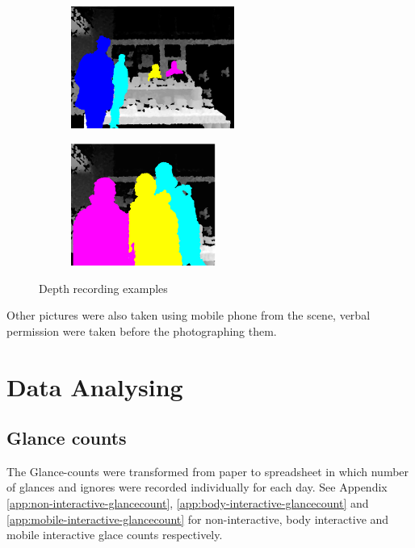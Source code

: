 \begin{enumerate}
\begin{figure}[H]
    \centering
    \begin{subfigure}[H]{0.45\textwidth}
        \centering
        \includegraphics[width=\textwidth,height=4cm]{Figures/8/d1}
        \caption{}
        \label{fig:d1}
    \end{subfigure}
    \begin{subfigure}[H]{0.45\textwidth}
        \centering
        \includegraphics[width=\textwidth,height=4cm]{Figures/8/d2}
        \caption{}
        \label{fig:d2}
    \end{subfigure}
    \caption{Depth recording examples}
    \label{fig:DepthRecordedImages}
\end{figure}




\end{enumerate}

Other pictures were also taken using mobile phone from the scene, verbal permission were taken before the photographing them.


\section{Data Analysing}

\subsection {Glance counts} 
The Glance-counts were transformed from paper to spreadsheet in which number of glances and ignores were recorded individually for each day. See Appendix \ref{app:non-interactive-glancecount}, \ref{app:body-interactive-glancecount} and \ref{app:mobile-interactive-glancecount} for non-interactive, body interactive and mobile interactive glace counts respectively.

